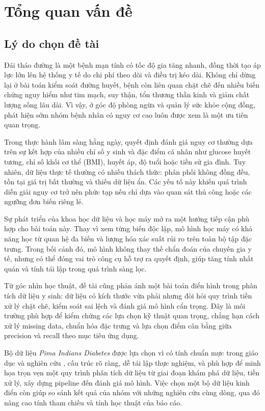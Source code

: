 \chapter{Tổng quan vấn đề}

\section{Lý do chọn đề tài}
Đái tháo đường là một bệnh mạn tính có tốc độ gia tăng nhanh, đồng thời tạo áp lực lớn lên hệ thống
y tế do chi phí theo dõi và điều trị kéo dài. Không chỉ dừng lại ở bài toán kiểm soát đường huyết,
bệnh còn liên quan chặt chẽ đến nhiều biến chứng nguy hiểm như tim mạch, suy thận, tổn thương thần kinh
và giảm chất lượng sống lâu dài. Vì vậy, ở góc độ phòng ngừa và quản lý sức khỏe cộng đồng, phát hiện
sớm nhóm bệnh nhân có nguy cơ cao luôn được xem là một ưu tiên quan trọng.

Trong thực hành lâm sàng hằng ngày, quyết định đánh giá nguy cơ thường dựa trên sự kết hợp của nhiều chỉ số
y sinh và đặc điểm cá nhân như glucose huyết tương, chỉ số khối cơ thể (BMI), huyết áp, độ tuổi hoặc tiền sử
gia đình. Tuy nhiên, dữ liệu thực tế thường có nhiều thách thức: phân phối không đồng đều, tồn tại giá trị bất
thường và thiếu dữ liệu ẩn. Các yếu tố này khiến quá trình diễn giải nguy cơ trở nên phức tạp nếu chỉ dựa vào
quan sát thủ công hoặc các ngưỡng đơn biến riêng lẻ.

Sự phát triển của khoa học dữ liệu và học máy mở ra một hướng tiếp cận phù hợp cho bài toán này. Thay vì xem
từng biến độc lập, mô hình học máy có khả năng học từ quan hệ đa biến và lượng hóa xác suất rủi ro trên toàn bộ
tập đặc trưng. Trong bối cảnh đó, mô hình không thay thế chẩn đoán của chuyên gia y tế, nhưng có thể đóng vai trò
công cụ hỗ trợ ra quyết định, giúp tăng tính nhất quán và tính tái lập trong quá trình sàng lọc.

Từ góc nhìn học thuật, đề tài cũng phản ánh một bài toán điển hình trong phân tích dữ liệu y sinh: dữ liệu có kích thước
vừa phải nhưng đòi hỏi quy trình tiền xử lý chặt chẽ, kiểm soát sai lệch và đánh giá mô hình cẩn trọng. Đây là môi trường
phù hợp để kiểm chứng các lựa chọn kỹ thuật quan trọng, chẳng hạn cách xử lý missing data, chuẩn hóa đặc trưng và lựa chọn
điểm cân bằng giữa precision và recall theo mục tiêu ứng dụng.

Bộ dữ liệu \textit{Pima Indians Diabetes} được lựa chọn vì có tính chuẩn mực trong giáo dục và nghiên cứu \cite{pima_uci,smith1988adap},
cấu trúc rõ ràng, dễ tái lập thực nghiệm, và phù hợp để minh họa trọn vẹn một quy trình phân tích dữ liệu từ giai đoạn khám phá
dữ liệu, tiền xử lý, xây dựng pipeline đến đánh giá mô hình. Việc chọn một bộ dữ liệu kinh điển còn giúp so sánh kết quả của nhóm
với những nghiên cứu cùng dòng, qua đó nâng cao tính tham chiếu và tính học thuật của báo cáo.

